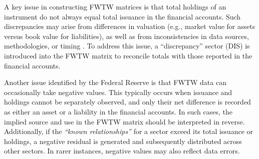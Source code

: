 A key issue in constructing FWTW matrices is that total holdings of an instrument do not always equal total issuance in the financial accounts. Such discrepancies may arise from differences in valuation (e.g., market value for assets versus book value for liabilities), as well as from inconsistencies in data sources, methodologies, or timing \parencite{batty_-whom--whom_2023}. To address this issue, a “discrepancy” sector (DIS) is introduced into the FWTW matrix to reconcile totals with those reported in the financial accounts.

Another issue identified by the Federal Reserve is that FWTW data can occasionally take negative values. This typically occurs when issuance and holdings cannot be separately observed, and only their net difference is recorded as either an asset or a liability in the financial accounts. In such cases, the implied source and use in the FWTW matrix should be interpreted in reverse. Additionally, if the \textit{“known relationships”} for a sector exceed its total issuance or holdings, a negative residual is generated and subsequently distributed across other sectors. In rarer instances, negative values may also reflect data errors. 

